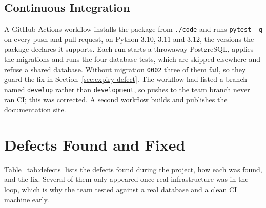 \subsection{Continuous Integration}

A GitHub Actions workflow installs the package from \texttt{./code} and
runs \texttt{pytest -q} on every push and pull request, on Python 3.10,
3.11 and 3.12, the versions the package declares it supports. Each run
starts a throwaway PostgreSQL, applies the migrations and runs the four
database tests, which are skipped elsewhere and refuse a shared database.
Without migration \texttt{0002} three of them fail, so they guard the
fix in Section~\ref{sec:expiry-defect}. The workflow had listed a branch
named \texttt{develop} rather than \texttt{development}, so pushes to the
team branch never ran CI; this was corrected. A second workflow builds
and publishes the documentation site.

\section{Defects Found and Fixed}

Table~\ref{tab:defects} lists the defects found during the project, how
each was found, and the fix. Several of them only appeared once real
infrastructure was in the loop, which is why the team tested against a
real database and a clean CI machine early.

